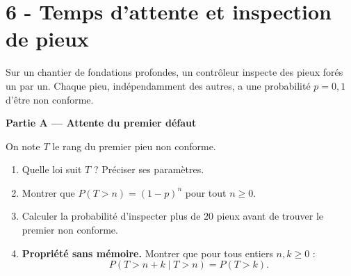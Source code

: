 \vspace{1em}

\section*{6 - Temps d'attente et inspection de pieux}

Sur un chantier de fondations profondes, un contrôleur inspecte des pieux forés un par un. Chaque pieu, indépendamment des autres, a une probabilité $p = 0{,}1$ d'être non conforme.

\medskip
\textbf{Partie A --- Attente du premier défaut}

\medskip

On note $T$ le rang du premier pieu non conforme.

\begin{enumerate}
    \item Quelle loi suit $T$ ? Préciser ses paramètres.

    \item Montrer que $P(T > n) = (1-p)^{n}$ pour tout $n \geq 0$.
    
    \item Calculer la probabilité d'inspecter plus de $20$ pieux avant de trouver le premier non conforme.

    \item \textbf{Propriété sans mémoire.} Montrer que pour tous entiers $n, k \geq 0$ :
    $$
    P(T > n + k \mid T > n) = P(T > k).
    $$
    

\end{enumerate}
